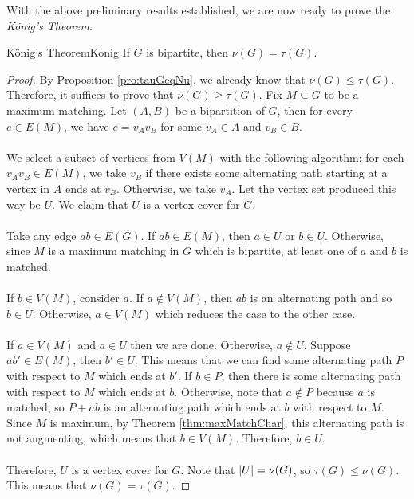 \documentclass[math, code]{amznotes}
\theoremstyle{remark}
\begin{document}
With the above preliminary results established, we are now ready to prove the \textit{K\"{o}nig's Theorem}.
\begin{thmbox}{K\"{o}nig's Theorem}{Konig}
    If $G$ is bipartite, then $\nu(G) = \tau(G)$.
    \tcblower
    \begin{proof}
        By Proposition \ref{pro:tauGeqNu}, we already know that $\nu(G) \leq \tau(G)$. Therefore, it suffices to prove that $\nu(G) \geq \tau(G)$. Fix $M \subseteq G$ to be a maximum matching. Let $(A, B)$ be a bipartition of $G$, then for every $e \in E(M)$, we have $e = v_Av_B$ for some $v_A \in A$ and $v_B \in B$.
        \\\\
        We select a subset of vertices from $V(M)$ with the following algorithm: for each $v_Av_B \in E(M)$, we take $v_B$ if there exists some alternating path starting at a vertex in $A$ ends at $v_B$. Otherwise, we take $v_A$. Let the vertex set produced this way be $U$. We claim that $U$ is a vertex cover for $G$.
        \\\\
        Take any edge $ab \in E(G)$. If $ab \in E(M)$, then $a \in U$ or $b \in U$. Otherwise, since $M$ is a maximum matching in $G$ which is bipartite, at least one of $a$ and $b$ is matched.
        \\\\
        If $b \in V(M)$, consider $a$. If $a \notin V(M)$, then $ab$ is an alternating path and so $b \in U$. Otherwise, $a \in V(M)$ which reduces the case to the other case.
        \\\\
        If $a \in V(M)$ and $a \in U$ then we are done. Otherwise, $a \notin U$. Suppose $ab' \in E(M)$, then $b' \in U$. This means that we can find some alternating path $P$ with respect to $M$ which ends at $b'$. If $b \in P$, then there is some alternating path with respect to $M$ which ends at $b$. Otherwise, note that $a \notin P$ because $a$ is matched, so $P + ab$ is an alternating path which ends at $b$ with respect to $M$. Since $M$ is maximum, by Theorem \ref{thm:maxMatchChar}, this alternating path is not augmenting, which means that $b \in V(M)$. Therefore, $b \in U$. 
        \\\\
        Therefore, $U$ is a vertex cover for $G$. Note that ${\left\lvert {U} \right\rvert} = \nu(G)$, so $\tau(G) \leq \nu(G)$. This means that $\nu(G) = \tau(G)$.
    \end{proof}
\end{thmbox}
\end{document}
